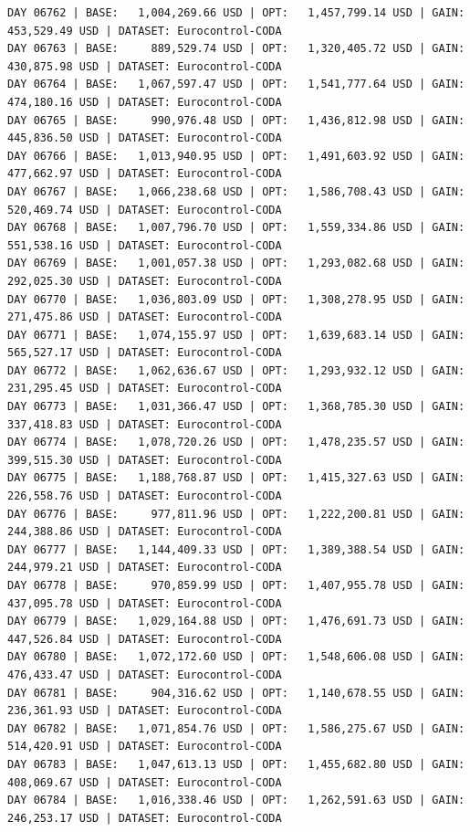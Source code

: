 \documentclass[11pt,a4paper]{article}
\begin{document}
\begin{verbatim}
DAY 06762 | BASE:   1,004,269.66 USD | OPT:   1,457,799.14 USD | GAIN: 453,529.49 USD | DATASET: Eurocontrol-CODA
DAY 06763 | BASE:     889,529.74 USD | OPT:   1,320,405.72 USD | GAIN: 430,875.98 USD | DATASET: Eurocontrol-CODA
DAY 06764 | BASE:   1,067,597.47 USD | OPT:   1,541,777.64 USD | GAIN: 474,180.16 USD | DATASET: Eurocontrol-CODA
DAY 06765 | BASE:     990,976.48 USD | OPT:   1,436,812.98 USD | GAIN: 445,836.50 USD | DATASET: Eurocontrol-CODA
DAY 06766 | BASE:   1,013,940.95 USD | OPT:   1,491,603.92 USD | GAIN: 477,662.97 USD | DATASET: Eurocontrol-CODA
DAY 06767 | BASE:   1,066,238.68 USD | OPT:   1,586,708.43 USD | GAIN: 520,469.74 USD | DATASET: Eurocontrol-CODA
DAY 06768 | BASE:   1,007,796.70 USD | OPT:   1,559,334.86 USD | GAIN: 551,538.16 USD | DATASET: Eurocontrol-CODA
DAY 06769 | BASE:   1,001,057.38 USD | OPT:   1,293,082.68 USD | GAIN: 292,025.30 USD | DATASET: Eurocontrol-CODA
DAY 06770 | BASE:   1,036,803.09 USD | OPT:   1,308,278.95 USD | GAIN: 271,475.86 USD | DATASET: Eurocontrol-CODA
DAY 06771 | BASE:   1,074,155.97 USD | OPT:   1,639,683.14 USD | GAIN: 565,527.17 USD | DATASET: Eurocontrol-CODA
DAY 06772 | BASE:   1,062,636.67 USD | OPT:   1,293,932.12 USD | GAIN: 231,295.45 USD | DATASET: Eurocontrol-CODA
DAY 06773 | BASE:   1,031,366.47 USD | OPT:   1,368,785.30 USD | GAIN: 337,418.83 USD | DATASET: Eurocontrol-CODA
DAY 06774 | BASE:   1,078,720.26 USD | OPT:   1,478,235.57 USD | GAIN: 399,515.30 USD | DATASET: Eurocontrol-CODA
DAY 06775 | BASE:   1,188,768.87 USD | OPT:   1,415,327.63 USD | GAIN: 226,558.76 USD | DATASET: Eurocontrol-CODA
DAY 06776 | BASE:     977,811.96 USD | OPT:   1,222,200.81 USD | GAIN: 244,388.86 USD | DATASET: Eurocontrol-CODA
DAY 06777 | BASE:   1,144,409.33 USD | OPT:   1,389,388.54 USD | GAIN: 244,979.21 USD | DATASET: Eurocontrol-CODA
DAY 06778 | BASE:     970,859.99 USD | OPT:   1,407,955.78 USD | GAIN: 437,095.78 USD | DATASET: Eurocontrol-CODA
DAY 06779 | BASE:   1,029,164.88 USD | OPT:   1,476,691.73 USD | GAIN: 447,526.84 USD | DATASET: Eurocontrol-CODA
DAY 06780 | BASE:   1,072,172.60 USD | OPT:   1,548,606.08 USD | GAIN: 476,433.47 USD | DATASET: Eurocontrol-CODA
DAY 06781 | BASE:     904,316.62 USD | OPT:   1,140,678.55 USD | GAIN: 236,361.93 USD | DATASET: Eurocontrol-CODA
DAY 06782 | BASE:   1,071,854.76 USD | OPT:   1,586,275.67 USD | GAIN: 514,420.91 USD | DATASET: Eurocontrol-CODA
DAY 06783 | BASE:   1,047,613.13 USD | OPT:   1,455,682.80 USD | GAIN: 408,069.67 USD | DATASET: Eurocontrol-CODA
DAY 06784 | BASE:   1,016,338.46 USD | OPT:   1,262,591.63 USD | GAIN: 246,253.17 USD | DATASET: Eurocontrol-CODA

\end{verbatim}
\end{document}

